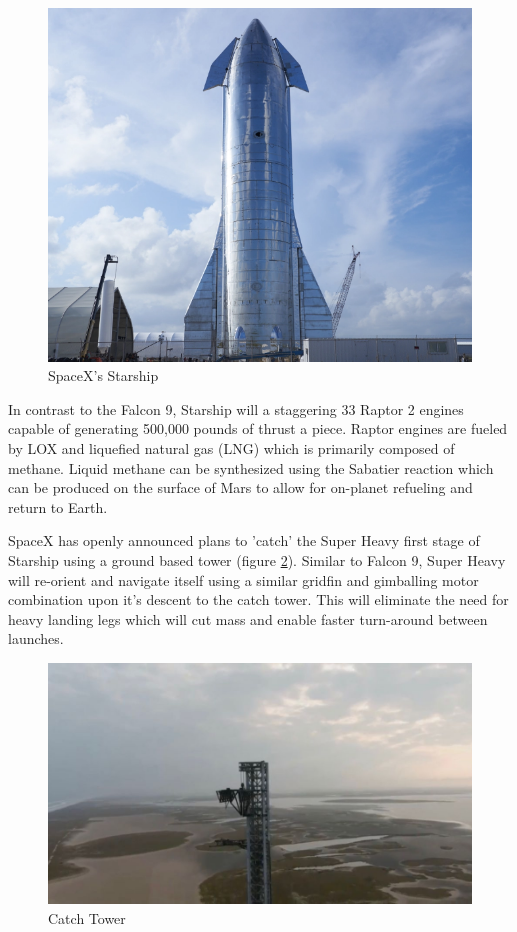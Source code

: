 \begin{figure}[H]
    \centering
    \includegraphics[scale = 0.7]{src/figs/Starship_2.png}
    \caption{SpaceX's Starship}
    \label{fig:Starship}
\end{figure}

In contrast to the Falcon 9, Starship will a staggering 33 Raptor 2 engines capable of generating 500,000 pounds of thrust a piece. Raptor engines are fueled by LOX and liquefied natural gas (LNG) which is primarily composed of methane. Liquid methane can be synthesized using the Sabatier reaction which can be produced on the surface of Mars to allow for on-planet refueling and return to Earth. 

SpaceX has openly announced plans to 'catch' the Super Heavy first stage of Starship using a ground based tower (figure \ref{fig:CTower}). Similar to Falcon 9, Super Heavy will re-orient and navigate itself using a similar gridfin and gimballing motor combination upon it's descent to the catch tower. This will eliminate the need for heavy landing legs which will cut mass and enable faster turn-around between launches.

\begin{figure}[H]
    \centering
    \includegraphics[scale = 0.4]{src/figs/CatchTower.jpg}
    \caption{Catch Tower}
    \label{fig:CTower}
\end{figure}

